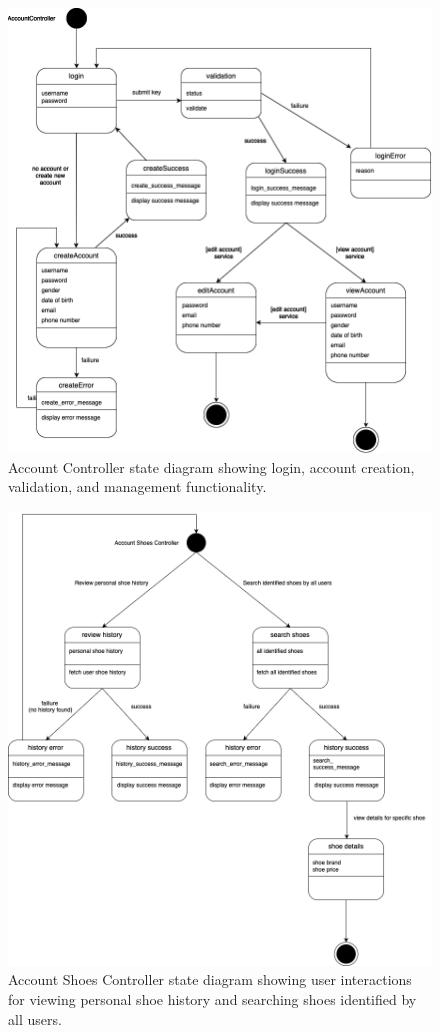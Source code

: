 \documentclass[]{article}
\begin{document}
\begin{figure}[H]
    \centering
    \includegraphics[width=\textwidth]{AccountController.drawio.png}
    \caption{Account Controller state diagram showing login, account creation, validation, and management functionality.}
\end{figure}

\begin{figure}[H]
    \centering
    \includegraphics[width=\textwidth]{AccountShoesController.drawio.png}
    \caption{Account Shoes Controller state diagram showing user interactions for viewing personal shoe history and searching shoes identified by all users.}
\end{figure}
\end{document}
